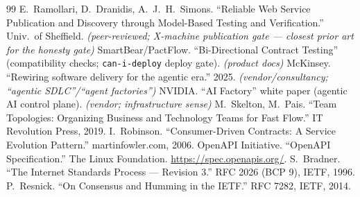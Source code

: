 \documentclass[11pt]{article}
\begin{document}
\begin{thebibliography}{99}
 E.~Ramollari, D.~Dranidis, A.~J.~H.~Simons. ``Reliable Web Service Publication and Discovery through Model-Based Testing and Verification.'' Univ.\ of Sheffield. \emph{(peer-reviewed; X-machine publication gate --- closest prior art for the honesty gate)}
 SmartBear/PactFlow. ``Bi-Directional Contract Testing'' (compatibility checks; \texttt{can-i-deploy} deploy gate). \emph{(product docs)}
 McKinsey. ``Rewiring software delivery for the agentic era.'' 2025. \emph{(vendor/consultancy; ``agentic SDLC''/``agent factories'')}
 NVIDIA. ``AI Factory'' white paper (agentic AI control plane). \emph{(vendor; infrastructure sense)}
 M.~Skelton, M.~Pais. ``Team Topologies: Organizing Business and Technology Teams for Fast Flow.'' IT Revolution Press, 2019.
 I.~Robinson. ``Consumer-Driven Contracts: A Service Evolution Pattern.'' martinfowler.com, 2006.
 OpenAPI Initiative. ``OpenAPI Specification.'' The Linux Foundation. \url{https://spec.openapis.org/}.
 S.~Bradner. ``The Internet Standards Process --- Revision 3.'' RFC 2026 (BCP 9), IETF, 1996.
 P.~Resnick. ``On Consensus and Humming in the IETF.'' RFC 7282, IETF, 2014.
\end{thebibliography}
\end{document}
